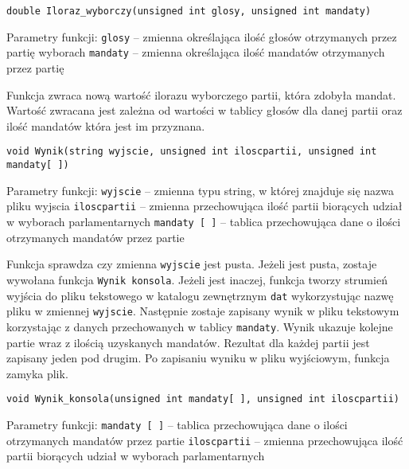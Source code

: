 \documentclass[12pt,a4paper]{article}
\begin{document}
\begin{lstlisting}
double Iloraz_wyborczy(unsigned int glosy, unsigned int mandaty)
\end{lstlisting}
Parametry funkcji: \newline
\texttt{glosy} -- zmienna określająca ilość głosów otrzymanych przez partię wyborach
\texttt{mandaty} -- zmienna określająca ilość mandatów otrzymanych przez partię

Funkcja zwraca nową wartość ilorazu wyborczego partii, która zdobyła mandat.
Wartość zwracana jest zależna od wartości w tablicy głosów dla danej partii oraz ilość mandatów która jest im przyznana.

\begin{lstlisting}
void Wynik(string wyjscie, unsigned int iloscpartii, unsigned int mandaty[ ])
\end{lstlisting}
Parametry funkcji: \newline
\texttt{wyjscie} -- zmienna typu string, w której znajduje się nazwa pliku wyjscia\newline
\texttt{iloscpartii} -- zmienna przechowująca ilość partii biorących udział w wyborach parlamentarnych 
\newline \texttt{mandaty [ ]} -- tablica przechowująca dane o ilości otrzymanych mandatów przez partie \newline

Funkcja sprawdza czy zmienna \texttt{wyjscie} jest pusta. Jeżeli jest pusta, zostaje wywołana funkcja \texttt{Wynik konsola}. Jeżeli jest inaczej, funkcja tworzy strumień wyjścia do pliku tekstowego w katalogu zewnętrznym \texttt{dat} wykorzystując nazwę pliku w zmiennej \texttt{wyjscie}. Następnie zostaje zapisany wynik w pliku tekstowym korzystając z danych przechowanych w tablicy 
\texttt{mandaty}. Wynik ukazuje kolejne partie wraz z ilością uzyskanych mandatów. Rezultat dla każdej partii jest zapisany jeden pod drugim.
Po zapisaniu wyniku w pliku wyjściowym, funkcja zamyka plik.

\begin{lstlisting}
void Wynik_konsola(unsigned int mandaty[ ], unsigned int iloscpartii)
\end{lstlisting}
Parametry funkcji: \newline
\texttt{mandaty [ ]} -- tablica przechowująca dane o ilości otrzymanych mandatów przez partie \newline
\texttt{iloscpartii} -- zmienna przechowująca ilość partii biorących udział w wyborach parlamentarnych \newline
\end{document}
